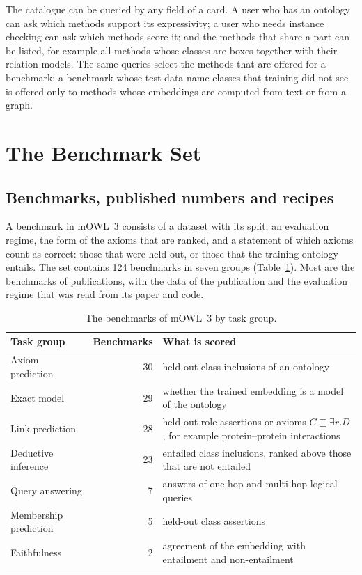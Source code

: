 \documentclass[runningheads]{llncs}
\begin{document}
The catalogue can be queried by any field of a card. A user who has an ontology can ask
which methods support its expressivity; a user who needs instance checking can ask which
methods score it; and the methods that share a part can be listed, for example all
methods whose classes are boxes together with their relation models. The same queries
select the methods that are offered for a benchmark: a benchmark whose test data name
classes that training did not see is offered only to methods whose embeddings are
computed from text or from a graph.

\section{The Benchmark Set}

\subsection{Benchmarks, published numbers and recipes}

A benchmark in mOWL~3 consists of a dataset with its split, an evaluation regime, the
form of the axioms that are ranked, and a statement of which axioms count as correct:
those that were held out, or those that the training ontology entails. The set contains
124 benchmarks in seven groups (Table~\ref{tab:benchmarks}). Most are the benchmarks of
publications, with the data of the publication and the evaluation regime that was read
from its paper and code.

\begin{table}[t]
\caption{The benchmarks of mOWL~3 by task group.}\label{tab:benchmarks}
\centering\footnotesize\setlength{\tabcolsep}{4pt}
\begin{tabular}{@{}lrp{6.6cm}@{}}
\toprule
Task group & Benchmarks & What is scored \\
\midrule
Axiom prediction & 30 & held-out class inclusions of an ontology \\
Exact model & 29 & whether the trained embedding is a model of the ontology \\
Link prediction & 28 & held-out role assertions or axioms $C \sqsubseteq \exists r.D$,
  for example protein--protein interactions \\
Deductive inference & 23 & entailed class inclusions, ranked above those that are not entailed \\
Query answering & 7 & answers of one-hop and multi-hop logical queries \\
Membership prediction & 5 & held-out class assertions \\
Faithfulness & 2 & agreement of the embedding with entailment and non-entailment \\
\bottomrule
\end{tabular}
\end{table}
\end{document}
